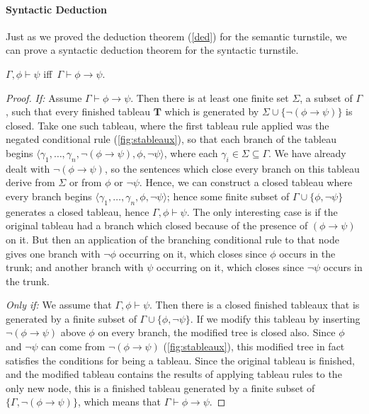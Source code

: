 \paragraph{Syntactic Deduction} Just as we proved the deduction theorem (\autoref{ded}) for the semantic turnstile, we can prove a syntactic deduction theorem for the syntactic turnstile.
\begin{theorem}\label{thm:sdt} $\Gamma, \phi\vdash \psi$ iff\, $\Gamma \vdash \phi \to \psi$. \begin{proof} \emph{If:} Assume $\Gamma \vdash \phi \to \psi$. Then there is at least one finite set $\Sigma$, a subset of $\Gamma$, such that every finished tableau $\mathbf{T}$ which is generated by $\Sigma \cup\{\neg(\phi \to \psi)\}$ is closed. Take one such tableau, where the first tableau rule applied was the negated conditional rule (\autoref{fig:stableaux}), so that each branch of the tableau begins $\langle \gamma_{1},\ldots,\gamma_{n}, \neg (\phi \to \psi), \phi, \neg \psi\rangle$, where each $\gamma_{i}\in \Sigma \subseteq \Gamma$. We have already dealt with $\neg (\phi \to \psi)$, so the sentences which close every branch on this tableau derive from $\Sigma$ or from $\phi$ or $\neg \psi$. Hence, we can construct a closed tableau where every branch begins $\langle \gamma_{1},\ldots,\gamma_{n}, \phi, \neg \psi\rangle$; hence some finite subset of $\Gamma\cup \{\phi, \neg \psi\}$ generates a closed tableau, hence $\Gamma, \phi \vdash \psi$. The only interesting case is if the original tableau had a branch which closed because of the presence of $(\phi \to \psi)$ on it. But then an application of the branching conditional rule to that node gives one branch with $\neg\phi$ occurring on it, which closes since $\phi$ occurs in the trunk;  and another branch with $\psi$ occurring on it, which closes since $\neg \psi$ occurs in the trunk. 

\noindent\emph{Only if:} We assume that $\Gamma, \phi \vdash \psi$. Then there is a closed finished tableaux that is generated by a finite subset of $\Gamma\cup \{\phi, \neg \psi\}$. If we modify this tableau by inserting $\neg(\phi \to \psi)$ above $\phi$ on every branch, the modified tree is closed also. Since $\phi$ and $\neg \psi$ can come from $\neg (\phi \to \psi)$ (\autoref{fig:stableaux}), this modified tree in fact satisfies the conditions for being a tableau. Since the original tableau is finished, and the modified tableau contains the results of applying tableau rules to the only new node, this is a finished tableau generated by  a finite subset of $\{\Gamma, \neg(\phi \to \psi)\}$, which means that $\Gamma \vdash \phi \to \psi$.
\end{proof}\end{theorem}

